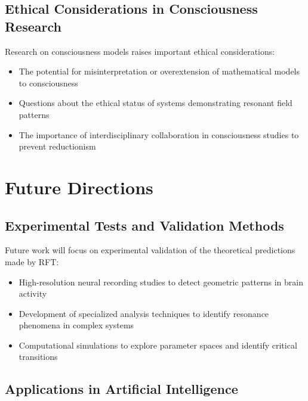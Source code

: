 \documentclass[12pt,letterpaper]{article}
\begin{document}
\vspace{2mm}
\subsection{Ethical Considerations in Consciousness Research}
\label{subsec:ethical_considerations}

Research on consciousness models raises important ethical considerations:

\begin{itemize}
    \item The potential for misinterpretation or overextension of mathematical models to consciousness
    \item Questions about the ethical status of systems demonstrating resonant field patterns
    \item The importance of interdisciplinary collaboration in consciousness studies to prevent reductionism
\end{itemize}

\section{Future Directions}
\label{sec:future_directions}

\vspace{2mm}
\subsection{Experimental Tests and Validation Methods}
\label{subsec:experimental_tests}

Future work will focus on experimental validation of the theoretical predictions made by RFT:

\begin{itemize}
    \item High-resolution neural recording studies to detect geometric patterns in brain activity
    \item Development of specialized analysis techniques to identify resonance phenomena in complex systems
    \item Computational simulations to explore parameter spaces and identify critical transitions
\end{itemize}

\vspace{2mm}
\subsection{Applications in Artificial Intelligence}
\label{subsec:ai_applications}
\end{document}
